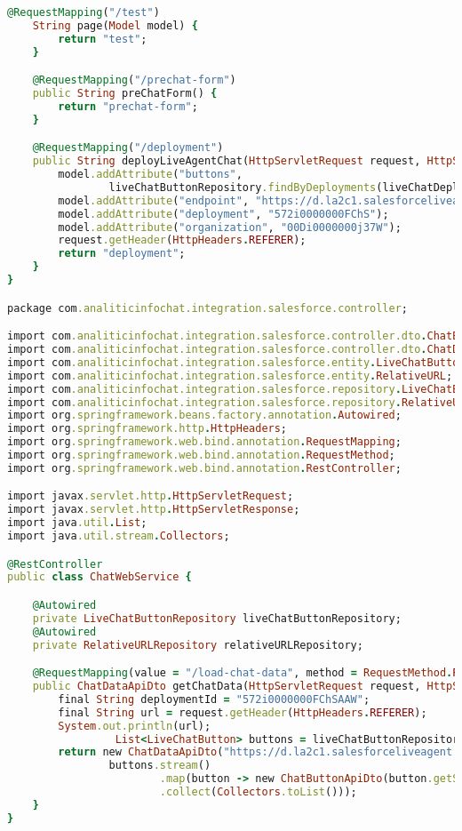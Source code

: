 \begin{lstlisting}[language=Ruby, style=rubystyle]
    @RequestMapping("/test")
    String page(Model model) {
        return "test";
    }

    @RequestMapping("/prechat-form")
    public String preChatForm() {
        return "prechat-form";
    }

    @RequestMapping("/deployment")
    public String deployLiveAgentChat(HttpServletRequest request, HttpServletResponse response, Model model) {
        model.addAttribute("buttons",
                liveChatButtonRepository.findByDeployments(liveChatDeploymentRepository.findAll()));
        model.addAttribute("endpoint", "https://d.la2c1.salesforceliveagent.com/chat");
        model.addAttribute("deployment", "572i0000000FChS");
        model.addAttribute("organization", "00Di0000000j37W");
        request.getHeader(HttpHeaders.REFERER);
        return "deployment";
    }
}

package com.analiticinfochat.integration.salesforce.controller;

import com.analiticinfochat.integration.salesforce.controller.dto.ChatButtonApiDto;
import com.analiticinfochat.integration.salesforce.controller.dto.ChatDataApiDto;
import com.analiticinfochat.integration.salesforce.entity.LiveChatButton;
import com.analiticinfochat.integration.salesforce.entity.RelativeURL;
import com.analiticinfochat.integration.salesforce.repository.LiveChatButtonRepository;
import com.analiticinfochat.integration.salesforce.repository.RelativeURLRepository;
import org.springframework.beans.factory.annotation.Autowired;
import org.springframework.http.HttpHeaders;
import org.springframework.web.bind.annotation.RequestMapping;
import org.springframework.web.bind.annotation.RequestMethod;
import org.springframework.web.bind.annotation.RestController;

import javax.servlet.http.HttpServletRequest;
import javax.servlet.http.HttpServletResponse;
import java.util.List;
import java.util.stream.Collectors;

@RestController
public class ChatWebService {

    @Autowired
    private LiveChatButtonRepository liveChatButtonRepository;
    @Autowired
    private RelativeURLRepository relativeURLRepository;

    @RequestMapping(value = "/load-chat-data", method = RequestMethod.POST)
    public ChatDataApiDto getChatData(HttpServletRequest request, HttpServletResponse response) {
        final String deploymentId = "572i0000000FChSAAW";
        final String url = request.getHeader(HttpHeaders.REFERER);
        System.out.println(url);
				 List<LiveChatButton> buttons = liveChatButtonRepository.findAllByDeploymentId(deploymentId);
        return new ChatDataApiDto("https://d.la2c1.salesforceliveagent.com/chat", deploymentId.substring(0, 15), "00Di0000000j37W",
                buttons.stream()
                        .map(button -> new ChatButtonApiDto(button.getSfid().substring(0, 15), button.getType()))
                        .collect(Collectors.toList()));
    }
}


\end{lstlisting}
